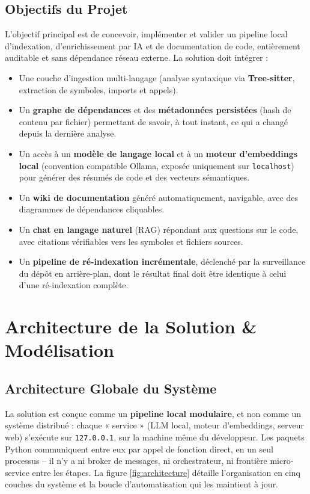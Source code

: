 \documentclass[12pt,a4paper]{report}
\begin{document}
\section{Objectifs du Projet}
L'objectif principal est de concevoir, implémenter et valider un pipeline local
d'indexation, d'enrichissement par IA et de documentation de code, entièrement
auditable et sans dépendance réseau externe. La solution doit intégrer :
\begin{itemize}
    \item Une couche d'ingestion multi-langage (analyse syntaxique via
    \textbf{Tree-sitter}, extraction de symboles, imports et appels).
    \item Un \textbf{graphe de dépendances} et des \textbf{métadonnées persistées}
    (hash de contenu par fichier) permettant de savoir, à tout instant, ce qui a
    changé depuis la dernière analyse.
    \item Un accès à un \textbf{modèle de langage local} et à un \textbf{moteur
    d'embeddings local} (convention compatible Ollama, exposée uniquement sur
    \texttt{localhost}) pour générer des résumés de code et des vecteurs
    sémantiques.
    \item Un \textbf{wiki de documentation} généré automatiquement, navigable, avec
    des diagrammes de dépendances cliquables.
    \item Un \textbf{chat en langage naturel} (RAG) répondant aux questions sur le
    code, avec citations vérifiables vers les symboles et fichiers sources.
    \item Un \textbf{pipeline de ré-indexation incrémentale}, déclenché par la
    surveillance du dépôt en arrière-plan, dont le résultat final doit être identique
    à celui d'une ré-indexation complète.
\end{itemize}

\newpage

\chapter{Architecture de la Solution \& Modélisation}

\section{Architecture Globale du Système}
La solution est conçue comme un \textbf{pipeline local modulaire}, et non comme un
système distribué : chaque « service » (LLM local, moteur d'embeddings, serveur web)
s'exécute sur \texttt{127.0.0.1}, sur la machine même du développeur. Les paquets
Python communiquent entre eux par appel de fonction direct, en un seul processus --
il n'y a ni broker de messages, ni orchestrateur, ni frontière micro-service entre
les étapes. La figure \ref{fig:architecture} détaille l'organisation en cinq couches
du système et la boucle d'automatisation qui les maintient à jour.
\end{document}
